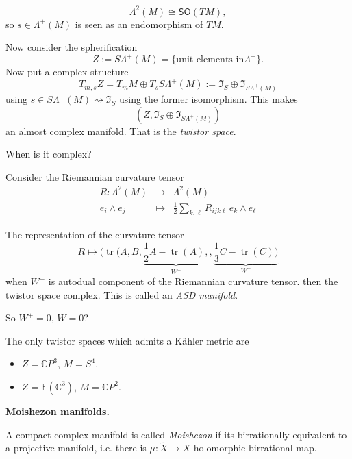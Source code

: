 \begin{remark}
\label{remark-tw-lambda-so}
$$
\Lambda^{2}(M)\cong \mathsf{SO}(TM),
$$
so $s\in\Lambda^{+}(M)$ is seen as an
endomorphism of $TM$.
\end{remark}

Now consider the spherification
$$
Z:=S\Lambda^{+}(M)=\{\text{unit elements in
}\Lambda^+ \}.
$$
Now put a complex structure
$$
T_{m,s}Z=T_mM\oplus
T_sS\Lambda^{+}(M):=\mathfrak{I}_S\oplus
\mathfrak{I}_{S\Lambda^{+}(M)}
$$
using $s\in S\Lambda^{+}(M)\rightsquigarrow
\mathfrak{I}_S$ using the former isomorphism.
This makes
$$
(Z,\mathfrak{I}_S\oplus
\mathfrak{I}_{S\Lambda^{+}(M)})
$$
an almost complex manifold. That is the {\it
twistor space}.

\begin{remark}[Question]
\label{remark-tw-question-complex}
When is it complex?
\end{remark}

Consider the Riemannian curvature tensor
$$
\begin{array}{rcl}
R:\Lambda^{2}(M) & \longrightarrow &
\Lambda^{2}(M) \\
e_i\wedge e_j & \longmapsto &
\frac{1}{2}\sum_{k,\ell}R_{ijk\ell}\,e_k
\wedge
e_\ell
\end{array}
$$

\begin{theorem}
\label{theorem-tw-singer}
The representation of the curvature tensor
$$
R\longmapsto(\operatorname{tr}(A,B,
\underbrace{\frac{1}{2}A-
\operatorname{tr}(A),}_{W^+},
\underbrace{\frac{1}{3}C-
\operatorname{tr}(C))}_{W^-}
$$
when $W^+$ is autodual component of the
Riemannian curvature tensor.
then the twistor space complex. This is
called an {\it ASD manifold}.

So $W^+=0$, $W=0$?
\end{theorem}

\begin{theorem}[N. Hitchin]
\label{theorem-tw-hitchin}
The only twistor spaces which admits a Kähler
metric are
\begin{itemize}
\item $Z=\mathbb{C}P^{3}$, $M=S^4$.
\item $Z=\mathbb{F}(\mathbb{C}^3)$,
$M=\mathbb{C}P^{2}$.
\end{itemize}
\end{theorem}

\medskip\noindent
{\bf Moishezon manifolds.}

\begin{definition}
\label{definition-tw-moishezon}
A compact complex manifold is called {\it
Moishezon} if its birrationally equivalent to
a projective manifold, i.e. there is
$\mu:\tilde{X}\to X$ holomorphic birrational
map.
\end{definition}

